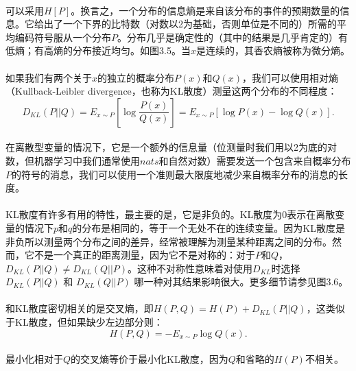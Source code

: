 \documentclass{article}
\begin{document}
   \paragraph{}
   可以采用$H[P]$。换言之，一个分布的信息熵是来自该分布的事件的预期数量的信息。它给出了一个下界的比特数（对数以2为基础，否则单位是不同的）所需的平均编码符号服从一个分布$P$。分布几乎是确定性的（其中的结果是几乎肯定的）有低熵；有高熵的分布接近均匀。如图3.5。当$x$是连续的，其香农熵被称为微分熵。
   \paragraph{}
   如果我们有两个关于$x$的独立的概率分布$P(x)$和$Q(x)$，我们可以使用相对熵（Kullback-Leibler divergence，也称为KL散度）测量这两个分布的不同程度：
   \begin{equation}
     D_{KL}(P||Q)=E_{x\sim P}[\log{\frac{P(x)}{Q(x)}}]=E_{x\sim P}[\log{P(x)-\log{Q(x)}}].\tag{3.50}
   \end{equation}
   \paragraph*{}
   在离散型变量的情况下，它是一个额外的信息量（位测量时我们用以2为底的对数，但机器学习中我们通常使用$nats$和自然对数）需要发送一个包含来自概率分布$P$的符号的消息，我们可以使用一个准则最大限度地减少来自概率分布的消息的长度。
   \paragraph{}
   KL散度有许多有用的特性，最主要的是，它是非负的。KL散度为0表示在离散变量的情况下$p$和$q$的分布是相同的，等于一个无处不在的连续变量。因为KL散度是非负所以测量两个分布之间的差异，经常被理解为测量某种距离之间的分布。然而，它不是一个真正的距离测量，因为它不是对称的：对于$P$和$Q$，$D_{KL}(P||Q)\neq D_{KL}(Q||P)$。这种不对称性意味着对使用$D_{KL}$时选择$D_{KL}(P||Q)$ 和 $D_{KL}(Q||P)$ 哪一种对其结果影响很大。更多细节请参见图3.6。
   \paragraph{}
   和KL散度密切相关的是交叉熵，即$H (P,Q) = H(P) + D_{KL}(P||Q)$，这类似于KL散度，但如果缺少左边部分则：
   \begin{equation}
     H(P,Q)=-E_{x\sim P}\log{Q(x)}.\tag{3.51}
   \end{equation}
  \paragraph{}
  最小化相对于$Q$的交叉熵等价于最小化KL散度，因为$Q$和省略的$H(P)$不相关。
\end{document}
